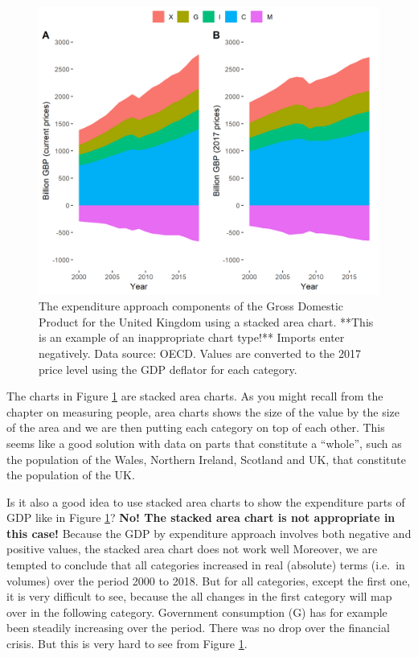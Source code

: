 \documentclass[]{book}
\begin{document}
\begin{figure}

{\centering \includegraphics[width=0.9\linewidth]{_resources/chapter_gdp/fig1} 

}

\caption{The expenditure approach components of the Gross Domestic Product for the United Kingdom using a stacked area chart. **This is an example of an inappropriate chart type!** Imports enter negatively. Data source: OECD. Values are converted to the 2017 price level using the GDP deflator for each category.}\label{fig:gdp3}
\end{figure}

The charts in Figure \ref{fig:gdp3} are stacked area charts. As you might recall from the chapter on measuring people, area charts shows the size of the value by the size of the area and we are then putting each category on top of each other. This seems like a good solution with data on parts that constitute a ``whole'', such as the population of the Wales, Northern Ireland, Scotland and UK, that constitute the population of the UK.

Is it also a good idea to use stacked area charts to show the expenditure parts of GDP like in Figure \ref{fig:gdp3}? \textbf{No! The stacked area chart is not appropriate in this case!} Because the GDP by expenditure approach involves both negative and positive values, the stacked area chart does not work well Moreover, we are tempted to conclude that all categories increased in real (absolute) terms (i.e.~in volumes) over the period 2000 to 2018. But for all categories, except the first one, it is very difficult to see, because the all changes in the first category will map over in the following category. Government consumption (G) has for example been steadily increasing over the period. There was no drop over the financial crisis. But this is very hard to see from Figure \ref{fig:gdp3}.
\end{document}
